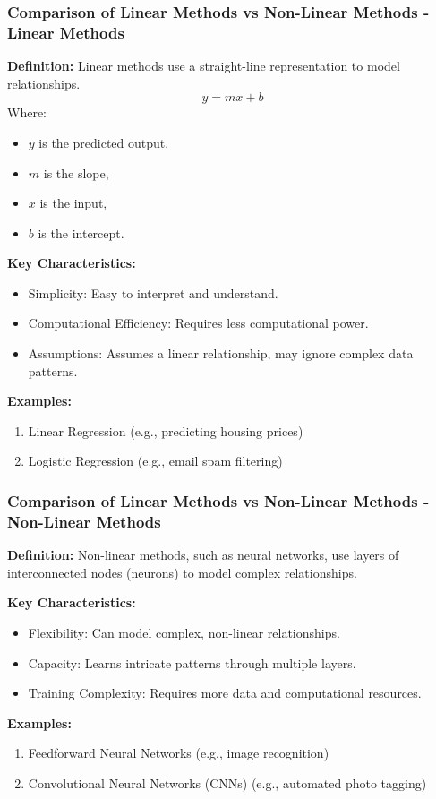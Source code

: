 \documentclass[aspectratio=169]{beamer}
\begin{document}
\begin{frame}[fragile]
    \frametitle{Comparison of Linear Methods vs Non-Linear Methods - Linear Methods}

    \textbf{Definition:} Linear methods use a straight-line representation to model relationships.
    \begin{equation}
        y = mx + b
    \end{equation}
    Where:
    \begin{itemize}
        \item $y$ is the predicted output,
        \item $m$ is the slope,
        \item $x$ is the input,
        \item $b$ is the intercept.
    \end{itemize}

    \textbf{Key Characteristics:}
    \begin{itemize}
        \item Simplicity: Easy to interpret and understand.
        \item Computational Efficiency: Requires less computational power.
        \item Assumptions: Assumes a linear relationship, may ignore complex data patterns.
    \end{itemize}

    \textbf{Examples:}
    \begin{enumerate}
        \item Linear Regression (e.g., predicting housing prices)
        \item Logistic Regression (e.g., email spam filtering)
    \end{enumerate}
\end{frame}

\begin{frame}[fragile]
    \frametitle{Comparison of Linear Methods vs Non-Linear Methods - Non-Linear Methods}

    \textbf{Definition:} Non-linear methods, such as neural networks, use layers of interconnected nodes (neurons) to model complex relationships.

    \textbf{Key Characteristics:}
    \begin{itemize}
        \item Flexibility: Can model complex, non-linear relationships.
        \item Capacity: Learns intricate patterns through multiple layers.
        \item Training Complexity: Requires more data and computational resources.
    \end{itemize}

    \textbf{Examples:}
    \begin{enumerate}
        \item Feedforward Neural Networks (e.g., image recognition)
        \item Convolutional Neural Networks (CNNs) (e.g., automated photo tagging)
    \end{enumerate}
\end{frame}
\end{document}
